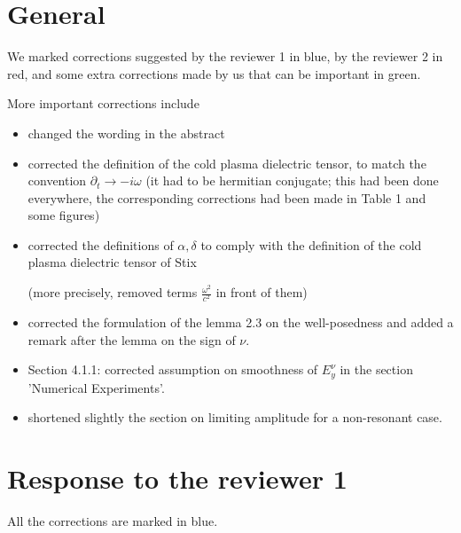 \documentclass[a4paper,10pt]{article}
\title{}
\author{}
\begin{document}
\maketitle

\begin{abstract}

\end{abstract}

\section{General}

We marked corrections suggested by the reviewer 1 in blue, by the reviewer 2 in red, 
and some extra corrections made by us that can be important in green.

More important corrections include
\begin{itemize}
\item changed the wording in the abstract

\item corrected the definition of the cold plasma dielectric tensor, to match the convention $\partial_t\rightarrow -i\omega$ (it had to be hermitian conjugate; 
this had been done everywhere, the corresponding corrections had been made in Table 1 and some figures)

\item corrected the definitions of $\alpha,\delta$ to comply with the definition of the cold plasma dielectric tensor of Stix 

(more precisely, removed terms $\frac{\omega^2}{c^2}$ in 
front of them)

\item corrected the formulation of the lemma 2.3 on the well-posedness and added a remark after the lemma on the sign of $\nu$.

\item Section 4.1.1: corrected assumption on smoothness of $E_y^{\nu}$ in the section 'Numerical Experiments'.

\item shortened slightly the section on limiting amplitude for a non-resonant case.
\end{itemize}


\section{Response to the reviewer 1}

All the corrections are marked in blue. 
\end{document}
